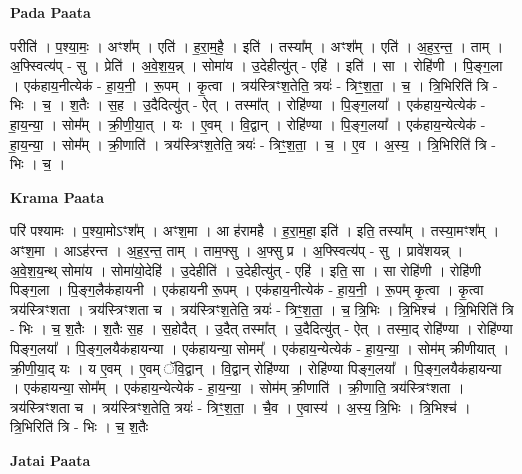 \documentclass[17pt]{extarticle}
\begin{document}
\textbf{Pada Paata} \newline

परीति॑ । प॒श्या॒मः॒ । अꣳश᳚म् । एति॑ । ह॒रा॒म॒है॒ । इति॑ । तस्या᳚म् । अꣳश᳚म् ।  एति॑ । अ॒ह॒र॒न्त॒ । ताम् । अ॒फ्स्वित्य॑प् - सु । प्रेति॑ । अ॒वे॒श॒य॒न्न् । सोमा॑य । उ॒देहीत्यु॑त् - एहि॑ । इति॑ । सा । रोहि॑णी । पि॒ङ्ग॒ला । एक॑हाय॒नीत्येक॑ - हा॒य॒नी॒ । रू॒पम् । कृ॒त्वा । त्रय॑स्त्रिꣳश॒तेति॒ त्रयः॑ - त्रिꣳ॒॒श॒ता॒ । च॒ । त्रि॒भिरिति॑ त्रि - भिः । च॒ । श॒तैः । स॒ह । उ॒दैदित्यु॑त् - ऐत् । तस्मा᳚त् । रोहि॑ण्या । पि॒ङ्ग॒लया᳚ । एक॑हाय॒न्येत्येक॑ - हा॒य॒न्या॒ । सोम᳚म् । क्री॒णी॒या॒त् । यः । ए॒वम् । वि॒द्वान् । रोहि॑ण्या । पि॒ङ्ग॒लया᳚ । एक॑हाय॒न्येत्येक॑ - हा॒य॒न्या॒ । सोम᳚म् । क्री॒णाति॑ । त्रय॑स्त्रिꣳश॒तेति॒ त्रयः॑ - त्रिꣳ॒॒श॒ता॒ । च॒ । ए॒व । अ॒स्य॒ । त्रि॒भिरिति॑ त्रि - भिः । च॒ ।  \newline


\textbf{Krama Paata} \newline

परि॑ पश्यामः । प॒श्या॒मोऽꣳश᳚म् । अꣳश॒मा । आ ह॑रामहै । ह॒रा॒म॒हा॒ इति॑ । इति॒ तस्या᳚म् । तस्या॒मꣳश᳚म् । अꣳश॒मा । आऽह॑रन्त । अ॒ह॒र॒न्त॒ ताम् । ताम॒फ्सु । अ॒फ्सु प्र । अ॒फ्स्वित्य॑प् - सु । प्रावे॑शयन्न् । अ॒वे॒श॒य॒न्थ् सोमा॑य । सोमा॑यो॒देहि॑ । उ॒देहीति॑ । उ॒देहीत्यु॑त् - एहि॑ । इति॒ सा । सा रोहि॑णी । रोहि॑णी पिङ्‍ग॒ला । पि॒ङ्‍ग॒लैक॑हायनी । एक॑हायनी रू॒पम् । एक॑हाय॒नीत्येक॑ - हा॒य॒नी॒ । रू॒पम् कृ॒त्वा । कृ॒त्वा त्रय॑स्त्रिꣳशता । त्रय॑स्त्रिꣳशता च । त्रय॑स्त्रिꣳश॒तेति॒ त्रयः॑ - त्रिꣳ॒॒श॒ता॒ । च॒ त्रि॒भिः । त्रि॒भिश्च॑ । त्रि॒भिरिति॑ त्रि - भिः । च॒ श॒तैः । श॒तैः स॒ह । स॒होदैत् । उ॒दैत् तस्मा᳚त् । उ॒दैदित्यु॑त् - ऐत् । तस्मा॒द् रोहि॑ण्या । रोहि॑ण्या पिङ्‍ग॒लया᳚ । पि॒ङ्‍ग॒लयैक॑हायन्या । एक॑हायन्या॒ सोमम्᳚ । एक॑हाय॒न्येत्येक॑ - हा॒य॒न्या॒ । सोम॑म् क्रीणीयात् । क्री॒णी॒या॒द् यः । य ए॒वम् । ए॒वम् ॅवि॒द्वान् । वि॒द्वान् रोहि॑ण्या । रोहि॑ण्या पिङ्‍ग॒लया᳚ । पि॒ङ्‍ग॒लयैक॑हायन्या । एक॑हायन्या॒ सोम᳚म् । एक॑हाय॒न्येत्येक॑ - हा॒य॒न्या॒ । सोम॑म् क्री॒णाति॑ । क्री॒णाति॒ त्रय॑स्त्रिꣳशता । त्रय॑स्त्रिꣳशता च । त्रय॑स्त्रिꣳश॒तेति॒ त्रयः॑ - त्रिꣳ॒॒श॒ता॒ । चै॒व । ए॒वास्य॑ । अ॒स्य॒ त्रि॒भिः । त्रि॒भिश्च॑ । त्रि॒भिरिति॑ त्रि - भिः । च॒ श॒तैः \newline

\textbf{Jatai Paata} \newline
\end{document}
